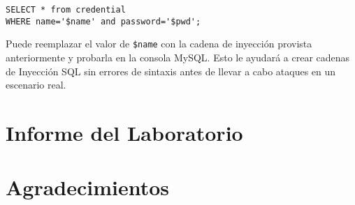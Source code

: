 \begin{lstlisting}
SELECT * from credential 
WHERE name='$name' and password='$pwd';
\end{lstlisting}

Puede reemplazar el valor de {\tt \$name} con la cadena de inyección provista anteriormente y probarla en la consola MySQL.
Esto le ayudará a crear cadenas de Inyección SQL sin errores de sintaxis antes de llevar a cabo ataques en un escenario real.



\section{Informe del Laboratorio}





\section*{Agradecimientos}











